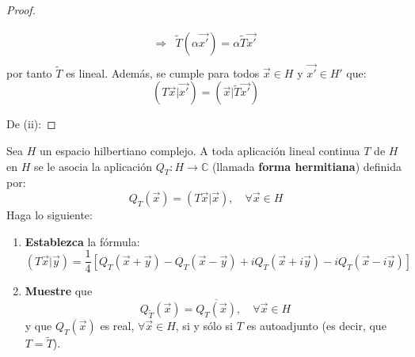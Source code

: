 \documentclass[12pt]{report}
\theoremstyle{largebreak}
\newcommand\cf[3]{\ensuremath{#1:#2\rightarrow#3}}
\newcommand\adj[1]{\ensuremath{\widetilde{#1}}}
\newcommand\pint[2]{\ensuremath{\left(#1\big|#2\right)}}
\newcommand\conj[1]{\ensuremath{\overline{#1}}}
\begin{document}
\begin{proof}
\begin{itemize}
\begin{equation*}
\begin{split}
                    \Rightarrow&\adj{T}(\alpha\vec{x'})=\alpha\adj{T}\vec{x'}\\
                \end{split}
            \end{equation*}
            por tanto $\adj{T}$ es lineal. Además, se cumple para todos $\vec{x}\in H$ y $\vec{x'}\in H'$ que:
            \begin{equation*}
                \pint{T\vec{x}}{\vec{x'}}=\pint{\vec{x}}{\adj{T} \vec{x'}}
            \end{equation*}
        \end{itemize}

        De (ii): 
    \end{proof}

    \begin{excer}
        Sea $H$ un espacio hilbertiano complejo. A toda aplicación lineal continua $T$ de $H$ en $H$ se le asocia la aplicación $\cf{Q_T}{H}{\mathbb{C}}$ (llamada \textbf{forma hermitiana}) definida por:
        \begin{equation*}
            Q_T(\vec{x})=\pint{T\vec{x}}{\vec{x}},\quad\forall\vec{x}\in H
        \end{equation*}
        Haga lo siguiente:
        \begin{enumerate}
            \item \textbf{Establezca} la fórmula:
            \begin{equation*}
                \pint{T\vec{x}}{\vec{y}}=\frac{1}{4}\left[Q_T(\vec{x}+\vec{y})-Q_T(\vec{x}-\vec{y})+iQ_T(\vec{x}+i\vec{y})-iQ_T(\vec{x}-i\vec{y})\right]
            \end{equation*}
            \item \textbf{Muestre} que
            \begin{equation*}
                Q_{\adj{T}}(\vec{x})=\conj{Q_T(\vec{x})},\quad\forall\vec{x}\in H
            \end{equation*}
            y que $Q_T(\vec{x})$ es real, $\forall\vec{x}\in H$, si y sólo si $T$ es autoadjunto (es decir, que $T=\adj{T}$).
        \end{enumerate}
    \end{excer}
\end{document}
